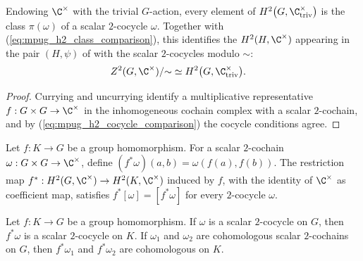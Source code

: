 \begin{lemma}
    \label{thm:mpug_h2_group_cohomology_comparison}
    \leanok
    Endowing $\C^\times$ with the trivial $G$-action, every element of
    $H^2\bigl(G,\C^\times_{\mathrm{triv}}\bigr)$ is the class $\pi(\omega)$ of
    a scalar $2$-cocycle $\omega$. Together with
    (\ref{eq:mpug_h2_class_comparison}), this identifies the
    $H^2(H,\C^\times)$ appearing in the pair $(H,\psi)$ of
    \cite[lines~1927--1931]{FrancoRubio2025MPUGauging} with the scalar
    $2$-cocycles modulo $\sim$:
    \begin{align}
        Z^2(G,\C^\times)/{\sim}
         & \simeq H^2\bigl(G,\C^\times_{\mathrm{triv}}\bigr).
        \label{eq:mpug_h2_equivalence}
    \end{align}
\end{lemma}

\begin{proof}\leanok
    Currying and uncurrying identify a multiplicative representative
    $f:G\times G\to\C^\times$ in the inhomogeneous cochain complex with a
    scalar $2$-cochain, and by (\ref{eq:mpug_h2_cocycle_comparison}) the
    cocycle conditions agree.
\end{proof}

\begin{definition}
    \label{def:mpug_h2_pullback}
    \leanok
    Let $f:K\to G$ be a group homomorphism. For a scalar $2$-cochain
    $\omega:G\times G\to\C^\times$, define
    $(f^*\omega)(a,b)=\omega(f(a),f(b))$.
    The restriction map
    $f^*:H^2(G,\C^\times)\to H^2(K,\C^\times)$ induced by $f$, with the
    identity of $\C^\times$ as coefficient map, satisfies
    $f^*[\omega]=[f^*\omega]$ for every $2$-cocycle $\omega$.
\end{definition}

\begin{lemma}
    \label{thm:mpug_h2_pullback_preserves}
    \leanok
    Let $f:K\to G$ be a group homomorphism. If $\omega$ is a scalar
    $2$-cocycle on $G$, then $f^*\omega$ is a scalar $2$-cocycle on $K$.
    If $\omega_1$ and $\omega_2$ are cohomologous scalar $2$-cochains on $G$,
    then $f^*\omega_1$ and $f^*\omega_2$ are cohomologous on $K$.
\end{lemma}

